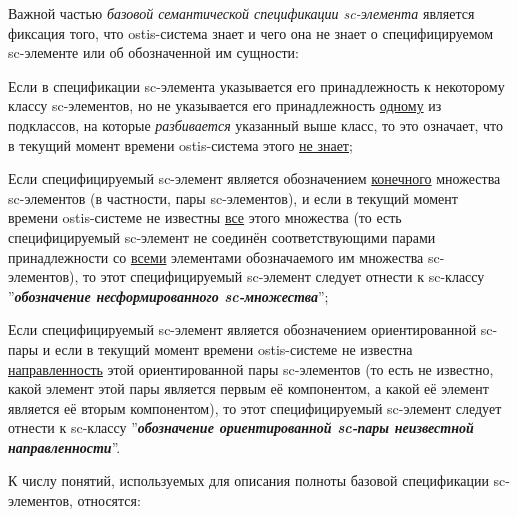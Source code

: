 \begin{SCn}
\end{SCn}

\begin{SCn}
\end{SCn}

Важной частью \textit{базовой семантической спецификации sc-элемента} является фиксация того, что ostis-система знает и чего она не знает о специфицируемом sc-элементе или об обозначенной им сущности:

\begin{textitemize}
	\item Если в спецификации sc-элемента указывается его принадлежность к некоторому классу sc-элементов, но не указывается его принадлежность \underline{одному} из подклассов, на которые \textit{разбивается} указанный выше класс, то это означает, что в текущий момент времени ostis-система этого \underline{не знает};
	\item Если специфицируемый sc-элемент является обозначением \underline{конечного} множества sc-элементов (в частности, пары sc-элементов), и если в текущий момент времени ostis-системе не известны \underline{все} этого множества (то есть специфицируемый sc-элемент не соединён соответствующими парами принадлежности со \underline{всеми} элементами обозначаемого им множества sc-элементов), то этот специфицируемый sc-элемент следует отнести к sc-классу ''\textbf{\textit{обозначение несформированного sc-множества}}'';
	\item Если специфицируемый sc-элемент является обозначением ориентированной sc-пары и если в текущий момент времени ostis-системе не известна \underline{направленность} этой ориентированной пары sc-элементов (то есть не известно, какой элемент этой пары является первым её компонентом, а какой её элемент является её вторым компонентом), то этот специфицируемый sc-элемент следует отнести к sc-классу ''\textbf{\textit{обозначение ориентированной sc-пары неизвестной направленности}}''.
\end{textitemize}

К числу понятий, используемых для описания полноты базовой спецификации sc-элементов, относятся:

